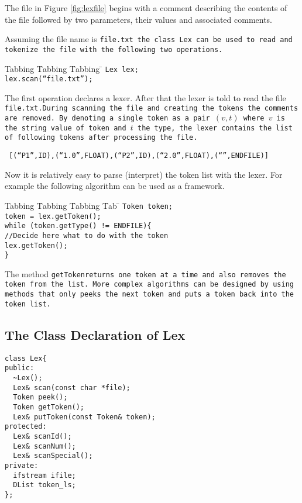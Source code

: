 The file in Figure \ref{fig:lexfile} begins with a comment describing
the contents of the file followed by two parameters, their values
and associated comments.
 
Assuming the file name is \tt file.txt \rm the class \tt Lex \rm can 
be used to read and tokenize the file
with the following two operations.

\begin{tabbing}
Tabbing \= Tabbing \= Tabbing \= \kill
\>\>\>\tt Lex lex; \\
\>\>\>\tt lex.scan(``file.txt'');
\end{tabbing}

The first operation declares a lexer. After that the lexer is
told to read the file \tt file.txt.\rm During scanning the file     
and creating the tokens the comments are removed. By denoting a single token 
as a pair $(v,t)$ where $v$ is the string value of token and $t$ the type,
the lexer contains the list of following tokens after processing the file.
\begin{center}
\tt 
[(``P1'',ID),(``1.0'',FLOAT),(``P2'',ID),(``2.0'',FLOAT),(``'',ENDFILE)]
\rm
\end{center}

Now it is relatively easy to parse (interpret) the token list 
with the lexer. For example the following algorithm can be used 
as a framework.

\begin{tabbing}
Tabbing \= Tabbing \= Tabbing \= Tab \= \kill
\>\>\>\tt Token token; \\
\>\>\>\tt token = lex.getToken(); \\  
\>\>\>\tt while (token.getType() != ENDFILE)\{\\
\>\>\>\>\tt //Decide here what to do with the token\\
\>\>\>\>\tt lex.getToken();\\
\>\>\>\tt \}
\end{tabbing}

The method \tt getToken\rm returns one token at a time and
also removes the token from the list. More complex algorithms can
be designed by using methods that only peeks the next token
and puts a token back into the token list.

\subsection{The Class Declaration of Lex}
\begin{verbatim}
class Lex{
public:
  ~Lex();
  Lex& scan(const char *file);
  Token peek();
  Token getToken();
  Lex& putToken(const Token& token);
protected:
  Lex& scanId();
  Lex& scanNum();
  Lex& scanSpecial();
private:
  ifstream ifile;
  DList token_ls;
};
\end{verbatim}

